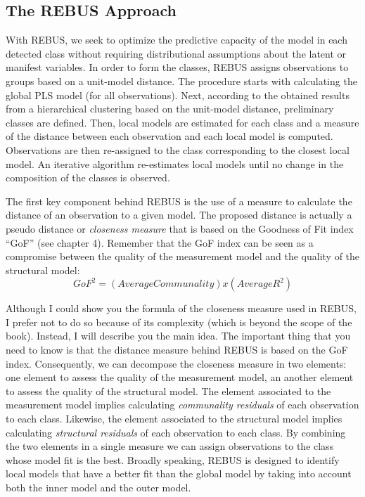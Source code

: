 \documentclass[12pt]{book}\usepackage{graphicx, color}
\begin{document}
\subsection{The REBUS Approach}
With REBUS, we seek to optimize the predictive capacity of the model in each detected class without requiring distributional assumptions about the latent or manifest variables. In order to form the classes, REBUS assigns observations to groups based on a unit-model distance. The procedure starts with calculating the global PLS model (for all observations). Next, according to the obtained results from a hierarchical clustering based on the unit-model distance, preliminary classes are defined. Then, local models are estimated for each class and a measure of the distance between each observation and each local model is computed. Observations are then re-assigned to the class corresponding to the closest local model. An iterative algorithm re-estimates local models until no change in the composition of the classes is observed.

The first key component behind REBUS is the use of a measure to calculate the distance of an observation to a given model. The proposed distance is actually a pseudo distance or \textit{closeness measure} that is based on the Goodness of Fit index ``GoF'' (see chapter 4). Remember that the GoF index can be seen as a compromise between the quality of the measurement model and the quality of the structural model:
$$ GoF^2 = (Average Communality) x (Average R^2) $$

Although I could show you the formula of the closeness measure used in REBUS, I prefer not to do so because of its complexity (which is beyond the scope of the book). Instead, I will describe you the main idea. The important thing that you need to know is that the distance measure behind REBUS is based on the GoF index. Consequently, we can decompose the closeness measure in two elements: one element to assess the quality of the measurement model, an another element to assess the quality of the structural model. The element associated to the measurement model implies calculating \textit{communality residuals} of each observation to each class. Likewise, the element associated to the structural model implies calculating \textit{structural residuals} of each observation to each class. By combining the two elements in a single measure we can assign observations to the class whose model fit is the best. Broadly speaking, REBUS is designed to identify local models that have a better fit than the global model by taking into account both the inner model and the outer model.
\end{document}
